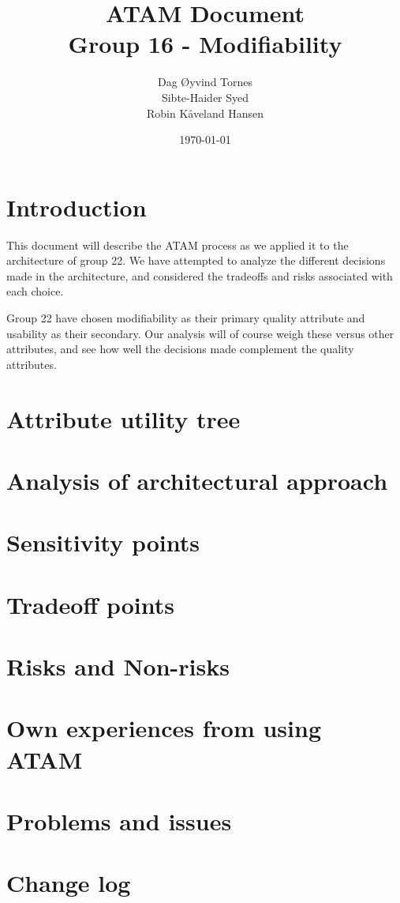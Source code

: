 \documentclass[titlepage,a4paper,10pt]{article}
\date{\today}
\begin{document}
\title{ATAM Document\\
 		Group 16 - Modifiability}

\author{Dag Øyvind Tornes\\
 		Sibte-Haider Syed\\ 
		Robin Kåveland Hansen\\}
\maketitle

\pagestyle{empty}
\tableofcontents
\clearpage
\pagestyle{plain}

\section{Introduction}
This document will describe the ATAM process as we applied it to the
architecture of group 22. We have attempted to analyze the different
decisions made in the architecture, and considered the tradeoffs and
risks associated with each choice.

Group 22 have chosen modifiability as their primary quality attribute
and usability as their secondary.  Our analysis will of course weigh
these versus other attributes, and see how well the decisions made
complement the quality attributes.

\section{Attribute utility tree}


\section{Analysis of architectural approach}


\section{Sensitivity points}


\section{Tradeoff points}


\section{Risks and Non-risks}


\section{Own experiences from using ATAM}


\section{Problems and issues}


\section{Change log}

\end{document}
